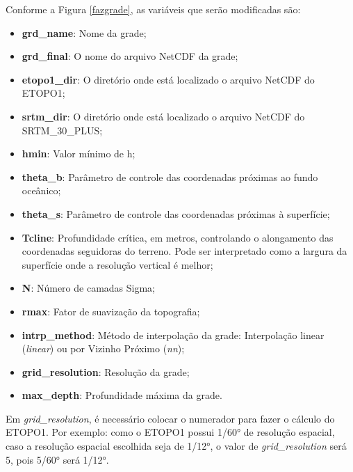 \noindent Conforme a Figura \textcolor{bleu_cite}{\ref{fazgrade}}, as variáveis que serão modificadas são:
\bigskip

\begin{itemize}
\item \textbf{grd\_name}: Nome da grade;
\item \textbf{grd\_final}: O nome do arquivo NetCDF da grade;
\item \textbf{etopo1\_dir}: O diretório onde está localizado o arquivo NetCDF do ETOPO1;
\item\textbf{srtm\_dir}: O diretório onde está localizado o arquivo NetCDF do SRTM\_30\_PLUS; 
\item \textbf{hmin}: Valor mínimo de h;
\item \textbf{theta\_b}: Parâmetro de controle das coordenadas próximas ao fundo oceânico;
\item \textbf{theta\_s}: Parâmetro de controle das coordenadas próximas à superfície;
\item \textbf{Tcline}: Profundidade crítica, em metros, controlando o alongamento das coordenadas seguidoras do terreno. Pode ser interpretado como a largura da superfície onde a resolução vertical é melhor;
\item \textbf{N}: Número de camadas Sigma;
\item \textbf{rmax}: Fator de suavização da topografia;
\item \textbf{intrp\_method}: Método de interpolação da grade: Interpolação linear (\textit{linear}) ou por Vizinho Próximo (\textit{nn});
\item \textbf{grid\_resolution}: Resolução da grade;
\item\textbf{max\_depth}: Profundidade máxima da grade.
\end{itemize}
\bigskip

\begin{tcolorbox}[enhanced,
    grow to left by   = 0cm,
    grow to right by  = 0cm,
    enlarge top by    = 0cm,
    enlarge bottom by = 0cm,
    tcbox raise base,
    boxrule           = 1.0pt,
    left              = 18mm,
    colframe          = red!50!black,coltext=red!25!black,colback=red!10!white,
    overlay           = {\begin{tcbclipinterior}\fill[red!75!blue!50!white] (frame.south west)
      rectangle node[text=white,font=\sffamily\bfseries\footnotesize,rotate=0] {ATENÇÃO} ([xshift=18mm]frame.north west);\end{tcbclipinterior}}]
  Em \textit{grid\_resolution}, é necessário colocar o numerador para fazer o cálculo do ETOPO1. Por exemplo: como o ETOPO1 possui 1/60° de resolução espacial, caso a resolução espacial escolhida seja de 1/12°, o valor de \textit{grid\_resolution} será 5, pois 5/60° será 1/12°.
\end{tcolorbox}
\bigskip

